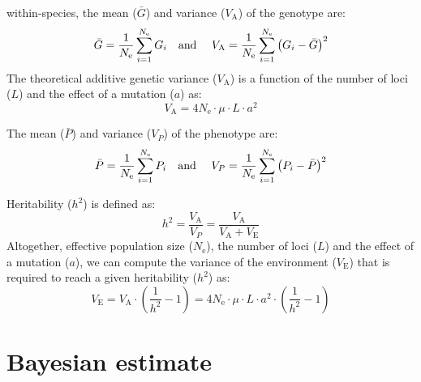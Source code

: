 \documentclass{article}
\newcommand{\Multiply}{\cdot}
\newcommand{\Ne}{N_{\text{e}}}
\newcommand{\Trait}{P}
\newcommand{\Heritability}{h^2}
\newcommand{\MutationRatePheno}{\mu}
\newcommand{\NbrLoci}{L}
\newcommand{\VarPhenotype}{V_{\Trait}}
\newcommand{\VarGenetic}{V_{\mathrm{A}}}
\newcommand{\VarEnv}{V_{\mathrm{E}}}
\begin{document}
within-species, the mean ($\bar{G}$) and variance ($\VarGenetic$) of the genotype are:
\begin{equation}
    \bar{G} = \frac{1}{\Ne}\sum_{i=1}^{\Ne} G_i  \text{\quad and \quad} \VarGenetic = \frac{1}{\Ne}\sum_{i=1}^{\Ne}\left(G_i - \bar{G} \right)^2\label{eq:simu-genotype}
\end{equation}
The theoretical additive genetic variance ($\VarGenetic$) is a function of the number of loci ($\NbrLoci$) and the effect of a mutation ($a$) as:
\begin{equation}
    \VarGenetic = 4 \Ne \Multiply \MutationRatePheno \Multiply \NbrLoci \Multiply a^2 \label{eq:simu-var-genetic}
\end{equation}

The mean ($\bar{\Trait}$) and variance ($\VarPhenotype$) of the phenotype are:
\begin{equation}
    \bar{\Trait} = \frac{1}{\Ne}\sum_{i=1}^{\Ne} \Trait_i \text{\quad and \quad} \VarPhenotype = \frac{1}{\Ne}\sum_{i=1}^{\Ne}\left(\Trait_i - \bar{\Trait} \right)^2 \label{eq:simu-between}
\end{equation}

Heritability ($\Heritability$) is defined as:
\begin{equation}
    \Heritability = \frac{\VarGenetic}{\VarPhenotype} = \frac{\VarGenetic}{\VarGenetic + \VarEnv}\label{eq:simu-heritability}
\end{equation}
Altogether, effective population size ($\Ne$), the number of loci ($\NbrLoci$) and the effect of a mutation ($a$), we can compute the variance of the environment ($\VarEnv$) that is required to reach a given heritability ($\Heritability$) as:
\begin{equation}
    \VarEnv = \VarGenetic \Multiply \left( \frac{1}{\Heritability} - 1 \right) = 4 \Ne \Multiply \MutationRatePheno \Multiply \NbrLoci \Multiply a^2 \Multiply \left( \frac{1}{\Heritability} - 1 \right) \label{eq:simu-var-env}
\end{equation}

\newpage
\section{Bayesian estimate}\label{sec:bayesian-estimate}
\end{document}
